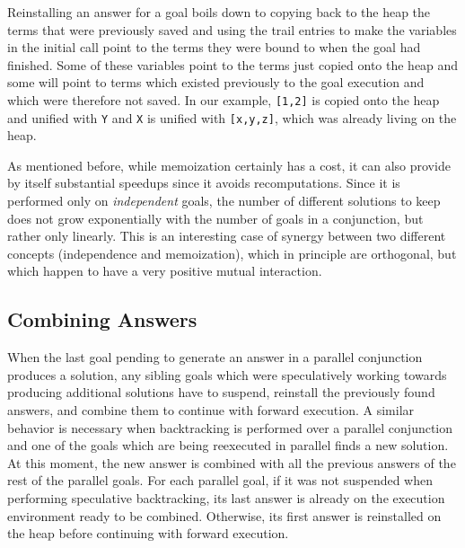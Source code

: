 \documentclass{tlp}
\newcommand{\compressection}{\vspace{-1em}}
\begin{document}
Reinstalling an answer for a goal boils down to copying back to the
heap the terms that were previously saved and using the trail entries
to make the variables in the initial call point to the terms they were
bound to when the goal had finished.  Some of these variables point to
the terms just copied onto the heap and some will point to terms which
existed previously to the goal execution and which were therefore not
saved. In our example, \lstinline{[1,2]} is copied onto the heap and
unified with \lstinline{Y} and \lstinline{X} is unified with
\lstinline{[x,y,z]}, which was already living on the heap.

























As mentioned before, while memoization certainly has a cost,
it can also provide by itself substantial speedups since it avoids
recomputations.  Since it is performed only on \emph{independent}
goals, the number of different solutions to keep does not grow
exponentially with the number of goals in a conjunction, but rather
only linearly.  This is an interesting case of synergy between two
different concepts (independence and memoization), which in principle
are orthogonal, but which happen to have a very positive mutual
interaction.


\compressection
\subsection{Combining Answers}
\label{sec:combining-answers}



When the last goal pending to generate an answer in a parallel
conjunction produces a solution, any sibling goals which were
speculatively working towards producing additional solutions 
have to suspend, reinstall the previously found answers, and combine
them to continue with forward execution.
A similar behavior is necessary when backtracking is performed over a parallel
conjunction and one of the goals which are being reexecuted in
parallel finds a new solution.
At this moment, the new answer is combined with all the previous
answers of the rest of the parallel goals.  For each parallel goal, if
it was not suspended when performing speculative backtracking, its
last answer is already on the execution environment ready to be
combined. Otherwise, its first answer is reinstalled on the heap
before continuing with forward execution.
\end{document}
